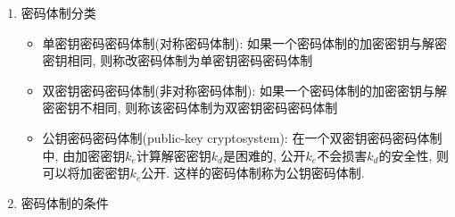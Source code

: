 \documentclass[UTF8]{ctexart}
\begin{document}
\begin{enumerate}
\begin{enumerate}
            \item 密码体制分类
            \begin{itemize}
                \item 单密钥密码密码体制(对称密码体制): 如果一个密码体制的加密密钥与解密密钥相同, 则称改密码体制为单密钥密码密码体制
                \item 双密钥密码密码体制(非对称密码体制): 如果一个密码体制的加密密钥与解密密钥不相同, 则称该密码体制为双密钥密码密码体制
                \item 公钥密码密码体制(public-key cryptosystem): 在一个双密钥密码密码体制中, 由加密密钥$k_e$计算解密密钥$k_d$是困难的, 公开$k_e$不会损害$k_d$的安全性, 则可以将加密密钥$k_e$公开. 这样的密码体制称为公钥密码体制.
            \end{itemize}
            \item 密码体制的条件


\end{enumerate}
\end{enumerate}
\end{document}
